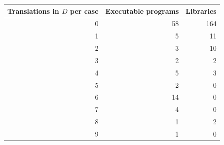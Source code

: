 \begin{tabular}{@{}r rr@{}}
\toprule
Translations in $D$ per case & Executable programs & Libraries \\
\midrule
0 & 58 & 164 \\
1 & 5 & 11 \\
2 & 3 & 10 \\
3 & 2 & 2 \\
4 & 5 & 3 \\
5 & 2 & 0 \\
6 & 14 & 0 \\
7 & 4 & 0 \\
8 & 1 & 2 \\
9 & 1 & 0 \\
\bottomrule
\end{tabular}
